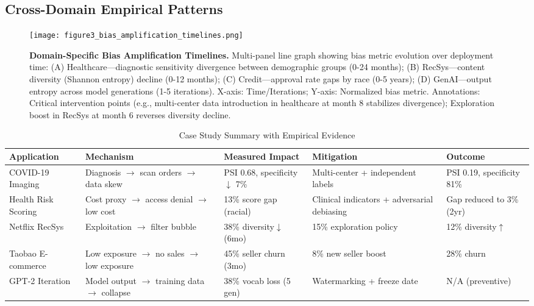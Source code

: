 \documentclass[11pt,a4paper]{article}
\begin{document}
\subsection{Cross-Domain Empirical Patterns}

\begin{figure}[htbp]
    \centering
    \texttt{[image: figure3\_bias\_amplification\_timelines.png]}
    \caption{\textbf{Domain-Specific Bias Amplification Timelines.} Multi-panel line graph showing bias metric evolution over deployment time: (A) Healthcare—diagnostic sensitivity divergence between demographic groups (0-24 months); (B) RecSys—content diversity (Shannon entropy) decline (0-12 months); (C) Credit—approval rate gaps by race (0-5 years); (D) GenAI—output entropy across model generations (1-5 iterations). X-axis: Time/Iterations; Y-axis: Normalized bias metric. Annotations: Critical intervention points (e.g., multi-center data introduction in healthcare at month 8 stabilizes divergence); Exploration boost in RecSys at month 6 reverses diversity decline.}
    \label{fig:bias_amplification}
\end{figure}

\begin{table}[htbp]
\centering
\caption{Case Study Summary with Empirical Evidence}
\label{tab:case_study}
\small
\begin{tabular}{@{}p{2.5cm}p{2.8cm}p{2.5cm}p{2.5cm}p{2.2cm}@{}}
\toprule
\textbf{Application} & \textbf{Mechanism} & \textbf{Measured Impact} & \textbf{Mitigation} & \textbf{Outcome} \\
\midrule
COVID-19 Imaging \cite{varoquaux2022} & Diagnosis $\rightarrow$ scan orders $\rightarrow$ data skew & PSI 0.68, specificity$\downarrow$ 7\% & Multi-center + independent labels & PSI 0.19, specificity 81\% \\
Health Risk Scoring \cite{vokinger2021} & Cost proxy $\rightarrow$ access denial $\rightarrow$ low cost & 13\% score gap (racial) & Clinical indicators + adversarial debiasing & Gap reduced to 3\% (2yr) \\
Netflix RecSys \cite{chen2023} & Exploitation $\rightarrow$ filter bubble & 38\% diversity$\downarrow$ (6mo) & 15\% exploration policy & 12\% diversity$\uparrow$ \\
Taobao E-commerce \cite{chen2023} & Low exposure $\rightarrow$ no sales $\rightarrow$ low exposure & 45\% seller churn (3mo) & 8\% new seller boost & 28\% churn \\
GPT-2 Iteration \cite{shumailov2024} & Model output $\rightarrow$ training data $\rightarrow$ collapse & 38\% vocab loss (5 gen) & Watermarking + freeze date & N/A (preventive) \\
\bottomrule
\end{tabular}
\end{table}
\end{document}
